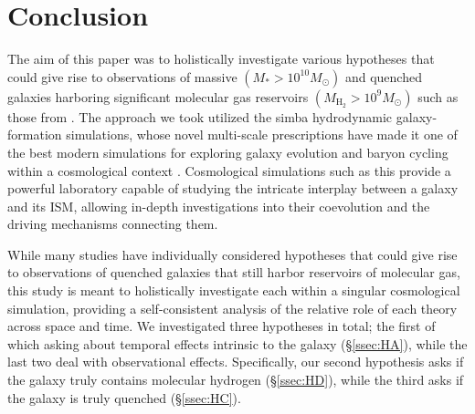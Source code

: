 \documentclass[twocolumn, linenumbers]{aastex631}
\newcommand{\mhh}{M_{\text{H}_2}}
\newcommand{\simba}[0]{{\sc simba} }
\begin{document}
\section{Conclusion}
\label{sec:conclusion}
The aim of this paper was to holistically investigate various hypotheses that could give rise to observations of massive $(M_*>10^{10}M_\odot)$ and quenched galaxies harboring significant molecular gas reservoirs $(\mhh>10^{9}M_\odot)$ such as those from \cite{rowlands, french_2015, suess_2017, Bezanson_2022, setton2025}.  The approach we took utilized the \simba hydrodynamic galaxy-formation simulations, whose novel multi-scale prescriptions have made it one of the best modern simulations for exploring galaxy evolution and baryon cycling within a cosmological context \citep{simba}.  Cosmological simulations such as this provide a powerful laboratory capable of studying the intricate interplay between a galaxy and its ISM, allowing in-depth investigations into their coevolution and the driving mechanisms connecting them.  

While many studies have individually considered hypotheses that could give rise to observations of quenched galaxies that still harbor reservoirs of molecular gas, this study is meant to holistically investigate each within a singular cosmological simulation, providing a self-consistent analysis of the relative role of each theory across space and time.  We investigated three hypotheses in total; the first of which asking about temporal effects intrinsic to the galaxy (\S\ref{ssec:HA}), while the last two deal with observational effects.  Specifically, our second hypothesis asks if the galaxy truly contains molecular hydrogen (\S\ref{ssec:HD}), while the third asks if the galaxy is truly quenched (\S\ref{ssec:HC}).
\end{document}
